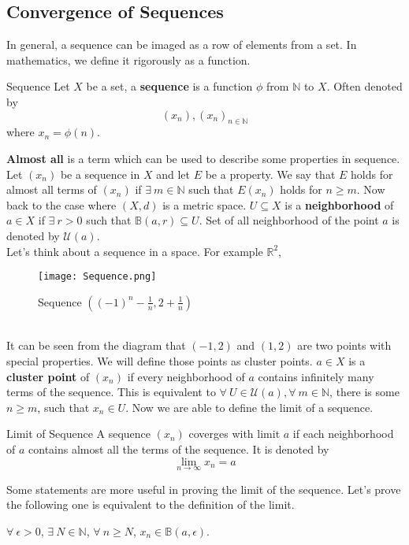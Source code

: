 \documentclass{article}
\begin{document}
\subsection{Convergence of Sequences}
In general, a sequence can be imaged as a row of elements from a set. In mathematics, we define it rigorously as a function.
\begin{defin}{Sequence}
    Let $X$ be a set, a \textbf{sequence} is a function $\phi$ from $\mathbb{N}$ to $X$. Often denoted by 
    $$
    (x_n), (x_n)_{n \in \mathbb{N}}
    $$
    where $x_n = \phi(n)$.
\end{defin}
\textbf{Almost all} is a term which can be used to describe some properties in sequence. Let $(x_n)$ be a sequence in $X$ and let $E$ be a 
property. We say that $E$ holds for almost all terms of $(x_n)$ if $\exists\ m \in \mathbb{N}$ such that $E(x_n)$ holds for $n \geq m$. Now back to the 
case where $(X,d)$ is a metric space. $U \subseteq X$ is a \textbf{neighborhood} of $a \in X$ if $\exists\ r > 0$ such that $\mathbb{B}(a,r) \subseteq U$.
Set of all neighborhood of the point $a$ is denoted by $\mathcal{U}(a)$.\\
Let's think about a sequence in a space. For example $\mathbb{R}^2$, 
\begin{figure}[h]
    \centering
    \texttt{[image: Sequence.png]}
    \caption{Sequence $\left((-1)^n - \frac{1}{n}, 2 + \frac{1}{n}\right)$}
\end{figure}
\\
It can be seen from the diagram that $(-1,2)$ and $(1,2)$ are two points with special properties. We will define those points as cluster points. $a \in X$ is a \textbf{cluster point}
of $(x_n)$ if every neighborhood of $a$ contains infinitely many terms of the sequence. This is equivalent to $\forall\ U \in \mathcal{U}(a), \forall\ m \in \mathbb{N}$, there is some $n \geq m$,
such that $x_n \in U$. Now we are able to define the limit of a sequence.
\begin{defin}{Limit of Sequence}
    A sequence $(x_n)$ coverges with limit $a$ if each neighborhood of $a$ contains almost all the terms of the sequence.
    It is denoted by 
    $$
    \lim_{n \to \infty}  x_n = a
    $$
\end{defin}
Some statements are more useful in proving the limit of the sequence. Let's prove the following one is equivalent to the definition of the limit. 
\begin{center}
    $\forall\ \epsilon > 0$, $\exists\ N \in \mathbb{N}$, $\forall\ n \geq N$, $x_n \in \mathbb{B}(a,\epsilon)$.
\end{center}
\end{document}
